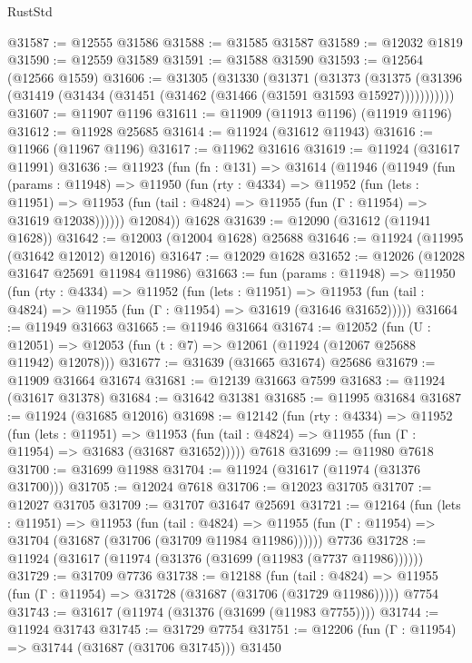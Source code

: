 \begin{lexlean}{RustStd}
\begin{coremodule}
{\begin{coremodule}
{{{{{{{{{{{{{{{{{{{{{{{{{{{{{{{{{{{{{{{{{{{{{{{{{{{{{{{{{{{{{{{{{{{{{{{{{{{{{{{{@31587 := @12555 @31586
@31588 := @31585 @31587
@31589 := @12032 @1819
@31590 := @12559 @31589
@31591 := @31588 @31590
@31593 := @12564 (@12566 @1559)
@31606 := @31305
    (@31330
      (@31371
        (@31373
          (@31375 (@31396 (@31419 (@31434 (@31451 (@31462 (@31466 (@31591 @31593 @15927)))))))))))
@31607 := @11907 @1196
@31611 := @11909 (@11913 @1196) (@11919 @1196)
@31612 := @11928 @25685
@31614 := @11924 (@31612 @11943)
@31616 := @11966 (@11967 @1196)
@31617 := @11962 @31616
@31619 := @11924 (@31617 @11991)
@31636 := @11923
    (fun (fn : @131) =>
    @31614
      (@11946
        (@11949
          (fun (params : @11948) =>
          @11950
            (fun (rty : @4334) =>
            @11952
              (fun (lets : @11951) =>
              @11953 (fun (tail : @4824) => @11955 (fun (Γ : @11954) => @31619 @12038))))))
        @12084))
    @1628
@31639 := @12090 (@31612 (@11941 @1628))
@31642 := @12003 (@12004 @1628) @25688
@31646 := @11924 (@11995 (@31642 @12012) @12016)
@31647 := @12029 @1628
@31652 := @12026 (@12028 @31647 @25691 @11984 @11986)
@31663 := fun (params : @11948) =>
  @11950
    (fun (rty : @4334) =>
    @11952
      (fun (lets : @11951) =>
      @11953 (fun (tail : @4824) => @11955 (fun (Γ : @11954) => @31619 (@31646 @31652)))))
@31664 := @11949 @31663
@31665 := @11946 @31664
@31674 := @12052
    (fun (U : @12051) => @12053 (fun (t : @7) => @12061 (@11924 (@12067 @25688 @11942) @12078)))
@31677 := @31639 (@31665 @31674) @25686
@31679 := @11909 @31664 @31674
@31681 := @12139 @31663 @7599
@31683 := @11924 (@31617 @31378)
@31684 := @31642 @31381
@31685 := @11995 @31684
@31687 := @11924 (@31685 @12016)
@31698 := @12142
    (fun (rty : @4334) =>
    @11952
      (fun (lets : @11951) =>
      @11953 (fun (tail : @4824) => @11955 (fun (Γ : @11954) => @31683 (@31687 @31652)))))
    @7618
@31699 := @11980 @7618
@31700 := @31699 @11988
@31704 := @11924 (@31617 (@11974 (@31376 @31700)))
@31705 := @12024 @7618
@31706 := @12023 @31705
@31707 := @12027 @31705
@31709 := @31707 @31647 @25691
@31721 := @12164
    (fun (lets : @11951) =>
    @11953
      (fun (tail : @4824) =>
      @11955 (fun (Γ : @11954) => @31704 (@31687 (@31706 (@31709 @11984 @11986))))))
    @7736
@31728 := @11924 (@31617 (@11974 (@31376 (@31699 (@11983 (@7737 @11986))))))
@31729 := @31709 @7736
@31738 := @12188
    (fun (tail : @4824) => @11955 (fun (Γ : @11954) => @31728 (@31687 (@31706 (@31729 @11986)))))
    @7754
@31743 := @31617 (@11974 (@31376 (@31699 (@11983 @7755))))
@31744 := @11924 @31743
@31745 := @31729 @7754
@31751 := @12206 (fun (Γ : @11954) => @31744 (@31687 (@31706 @31745))) @31450
}}}}}}}}}}}}}}}}}}}}}}}}}}}}}}}}}}}}}}}}}}}}}}}}}}}}}}}}}}}}}}}}}}}}}}}}}}}}}}}}
\end{coremodule}}
\end{coremodule}
\end{lexlean}
